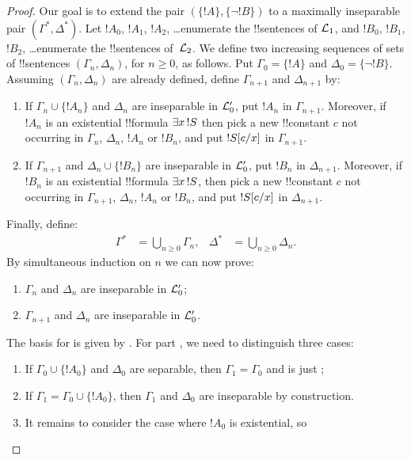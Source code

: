 \documentclass[../../../include/open-logic-section]{subfiles}
\begin{document}
\begin{proof}
Our goal is to extend the pair $(\{ !A \}, \{\lnot!B\})$ to a
maximally inseparable pair $(\Gamma^*, \Delta^*)$.  Let $!A_0$,
$!A_1$, $!A_2$, \dots enumerate the !!{sentence}s of $\Lang{L}_1$, and
$!B_0$, $!B_1$, $!B_2$, \dots enumerate the !!{sentence}s
of~$\Lang{L}_2$. We define two increasing sequences of sets of
!!{sentence}s $(\Gamma_n, \Delta_n)$, for $n \ge 0$, as follows. Put
$\Gamma_0 = \{ !A\}$ and $\Delta_0 = \{\lnot !B \}$. Assuming
$(\Gamma_n, \Delta_n)$ are already defined, define $\Gamma_{n+1}$ and
$\Delta_{n+1}$ by:
\begin{enumerate}
\item If $\Gamma_n \cup \{!A_n \}$ and $\Delta_n$ are inseparable in
  $\Lang{L}'_0$, put $!A_n$ in $\Gamma_{n+1}$. Moreover, if $!A_n$ is
  an existential !!{formula} $\lexists[x][!S]$ then pick a new
  !!{constant} $c$ not occurring in $\Gamma_n$, $\Delta_n$, $!A_n$ or
  $!B_n$, and put $!S[c/x]$ in $\Gamma_{n+1}$.
\item If $\Gamma_{n+1}$ and $\Delta_n \cup \{!B_n \}$ are inseparable
  in $\Lang{L}'_0$, put $!B_n$ in $\Delta_{n+1}$. Moreover, if $!B_n$
  is an existential !!{formula} $\lexists[x][!S]$, then pick a new
  !!{constant} $c$ not occurring in $\Gamma_{n+1}$, $\Delta_n$, $!A_n$
  or $!B_n$, and put $!S[c/x]$ in $\Delta_{n+1}$.
\end{enumerate}
Finally, define:
\begin{align*}
  \Gamma^* & = \bigcup_{n\ge 0} \Gamma_n, & 
  \Delta^* & = \bigcup_{n\ge 0} \Delta_n.
\end{align*}
By simultaneous induction on $n$ we can now prove:
\begin{enumerate}
\item{} $\Gamma_n$ and $\Delta_n$ are inseparable in
  $\Lang{L}'_0$;
\item{} $\Gamma_{n+1}$ and $\Delta_n$ are inseparable in
    $\Lang{L}'_0$.
\end{enumerate}
The basis for  is given by . For
part , we need to distinguish three cases:
\begin{enumerate}
\item If $\Gamma_0 \cup \{!A_0 \}$ and $\Delta_0$ are separable, then
  $\Gamma_1 = \Gamma_0$ and  is just ;
\item If $\Gamma_1 = \Gamma_0 \cup\{ !A_0\}$, then $\Gamma_1$ and
  $\Delta_0$ are inseparable by construction.
\item It remains to consider the case where $!A_0$ is existential, so

\end{enumerate}
\end{proof}
\end{document}
